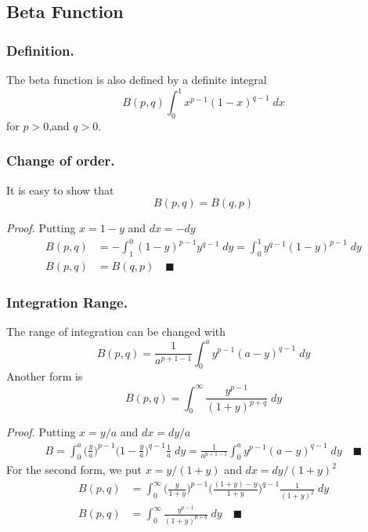 \documentclass[../main.tex]{subfiles}
\begin{document}
\subsection*{Beta Function}
\subsubsection*{Definition.} The beta function is also defined by a definite integral
\begin{equation*}
    B(p,q)\int_{0}^{1}x^{p-1} (1-x)^{q-1}\;dx 
\end{equation*}
for $p > 0$,and $q > 0$. 

\subsubsection*{Change of order.} It is easy to show that
\begin{equation*}
    B(p,q)=B(q,p)
\end{equation*}

\emph{Proof.} Putting $x=1-y$ and $dx=-dy$
\begin{align*}
    B(p,q)&=-\int_{1}^{0}(1-y)^{p-1}y^{q-1}\;dy= \int_{0 }^{1}y^{q-1}(1-y)^{p-1}\;dy\\
    B(p,q)&=B(q,p)\quad\blacksquare
\end{align*}

\subsubsection*{Integration Range.} The range of integration can be changed with 
\begin{equation*}
    B(p,q)=\frac{1}{a^{p+1-1}}  \int_{0}^{a} y^{p-1}(a-y)^{q-1}\;dy 
\end{equation*}
Another form is
\begin{equation*}
    B(p,q)=\int_{0}^{\infty}\frac{y^{p-1}}{(1+y)^{p+q}}\;dy
\end{equation*}

\emph{Proof.} Putting $x = y/a$ and $dx=dy/a$
\begin{align*}
    B=\int_{0}^{a}\big(\frac{y}{a}\big)^{p-1}\big(1-\frac{y}{a}\big)^{q-1}\frac{1}{a}\;dy=\frac{1}{a^{p+1-1}}  \int_{0}^{a} y^{p-1}(a-y)^{q-1}\;dy \quad\blacksquare
\end{align*}
For the second form, we put $x = y/(1 + y)$ and $dx=dy/(1+y)^2$
\begin{align*}
    B(p,q)&=\int_{0}^{\infty}\bigg(\frac{y}{1+y} \bigg)^{p-1} \bigg(\frac{(1+y)-y}{1+y}\bigg)^{q-1}\frac{1}{(1+y)^2}\;dy\\
    B(p,q)&=\int_{0}^{\infty}\frac{y^{p-1}}{(1+y)^{p+q}}\;dy\quad\blacksquare
\end{align*}
\end{document}
